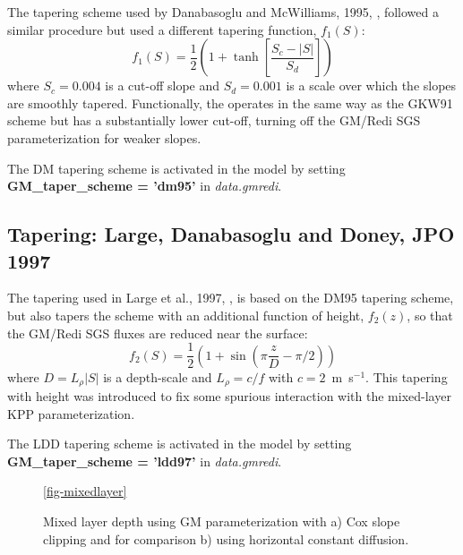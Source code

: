 The tapering scheme used by Danabasoglu and McWilliams, 1995,
\cite{DM95}, followed a similar procedure but used a different
tapering function, $f_1(S)$:
\begin{equation}
f_1(S) = \frac{1}{2} \left( 1+\tanh \left[ \frac{S_c - |S|}{S_d} \right] \right)
\end{equation}
where $S_c = 0.004$ is a cut-off slope and $S_d=0.001$ is a scale over
which the slopes are smoothly tapered. Functionally, the operates in
the same way as the GKW91 scheme but has a substantially lower
cut-off, turning off the GM/Redi SGS parameterization for weaker
slopes.

The DM tapering scheme is activated in the model by setting {\bf
GM\_tap\-er\_scheme = 'dm95'} in {\em data.gmredi}.

\subsection{Tapering: Large, Danabasoglu and Doney, JPO 1997}

The tapering used in Large et al., 1997, \cite{ldd97}, is based on the
DM95 tapering scheme, but also tapers the scheme with an additional
function of height, $f_2(z)$, so that the GM/Redi SGS fluxes are
reduced near the surface:
\begin{equation}
f_2(S) = \frac{1}{2} \left( 1 + \sin(\pi \frac{z}{D} - \pi/2)\right)
\end{equation}
where $D = L_\rho |S|$ is a depth-scale and $L_\rho=c/f$ with
$c=2$~m~s$^{-1}$.  This tapering with height was introduced to fix
some spurious interaction with the mixed-layer KPP parameterization.

The LDD tapering scheme is activated in the model by setting {\bf
GM\_tap\-er\_scheme = 'ldd97'} in {\em data.gmredi}.




\begin{figure}
\caption{Mixed layer depth using GM parameterization with a) Cox slope
clipping and for comparison b) using horizontal constant diffusion.}
\ref{fig-mixedlayer}
\end{figure}




